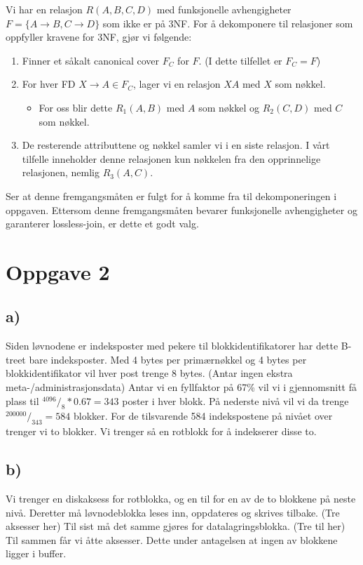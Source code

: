 \documentclass[a4paper, 12pt] {article}
\begin{document}
Vi har en relasjon $R(A,B,C,D)$ med funksjonelle avhengigheter $F = \{A \rightarrow B, C \rightarrow D\}$ som ikke er på 3NF. For å dekomponere til relasjoner som oppfyller kravene for 3NF, gjør vi følgende:

\begin{enumerate}
\item Finner et såkalt canonical cover $F_C$ for $F$. (I dette tilfellet er $F_C = F$)
\item For hver FD $X \rightarrow A \in F_C$, lager vi en relasjon $XA$ med $X$ som nøkkel.
    \begin{itemize}
    \item For oss blir dette $R_1(A,B)$ med $A$ som nøkkel og $R_2(C,D)$ med $C$ som nøkkel.
    \end{itemize}
\item De resterende attributtene og nøkkel samler vi i en siste relasjon. I vårt tilfelle inneholder denne relasjonen kun nøkkelen fra den opprinnelige relasjonen, nemlig $R_3(A,C)$.
\end{enumerate}

Ser at denne fremgangsmåten er fulgt for å komme fra til dekomponeringen i oppgaven. Ettersom denne fremgangsmåten bevarer funksjonelle avhengigheter og garanterer lossless-join, er dette et godt valg.

\section{Oppgave 2}
\subsection{a)}

Siden løvnodene er indeksposter med pekere til blokkidentifikatorer har dette B-treet bare indeksposter. Med 4 bytes per primærnøkkel og 4 bytes per blokkidentifikator vil hver post trenge 8 bytes. (Antar ingen ekstra meta-/administrasjonsdata) Antar vi en fyllfaktor på 67\% vil vi i gjennomsnitt få plass til $^{4096}/_{8} * 0.67 = 343$ poster i hver blokk. På nederste nivå vil vi da trenge $^{200000}/_{343} = 584$ blokker. For de tilsvarende 584 indekspostene på nivået over trenger vi to blokker. Vi trenger så en rotblokk for å indekserer disse to.

\subsection{b)}

Vi trenger en diskaksess for rotblokka, og en til for en av de to blokkene på neste nivå. Deretter må løvnodeblokka leses inn, oppdateres og skrives tilbake. (Tre aksesser her) Til sist må det samme gjøres for datalagringsblokka. (Tre til her) Til sammen får vi åtte aksesser. Dette under antagelsen at ingen av blokkene ligger i buffer.

\newpage

\end{document}
